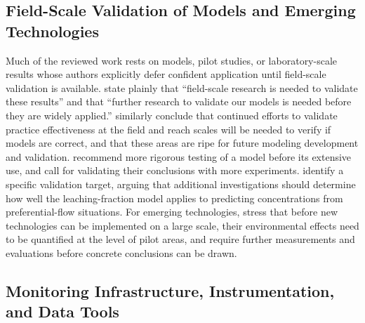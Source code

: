 \documentclass[11pt]{article}
\begin{document}
\subsection{Field-Scale Validation of Models and Emerging Technologies}

Much of the reviewed work rests on models, pilot studies, or laboratory-scale results whose authors explicitly defer confident application until field-scale validation is available. \textcite{Mitchell2025} state plainly that ``field-scale research is needed to validate these results'' and that ``further research to validate our models is needed before they are widely applied.'' \textcite{Kalcic2018} similarly conclude that continued efforts to validate practice effectiveness at the field and reach scales will be needed to verify if models are correct, and that these areas are ripe for future modeling development and validation. \textcite{Garmdareh2018} recommend more rigorous testing of a model before its extensive use, and \textcite{Yu2016} call for validating their conclusions with more experiments. \textcite{SHALIT1995} identify a specific validation target, arguing that additional investigations should determine how well the leaching-fraction model applies to predicting concentrations from preferential-flow situations. For emerging technologies, \textcite{DarziNaftchali2018b} stress that before new technologies can be implemented on a large scale, their environmental effects need to be quantified at the level of pilot areas, and \textcite{GUPTA1993} require further measurements and evaluations before concrete conclusions can be drawn.

\subsection{Monitoring Infrastructure, Instrumentation, and Data Tools}
\end{document}
